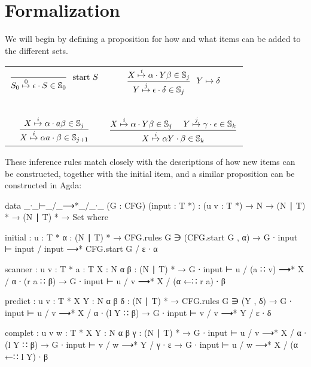 	\section{Formalization}

		We will begin by defining a proposition for how and what items can be
		added to the different sets.

		\begin{table}[h]
			\centering
			\begin{tabular}{cc}
				\( \displaystyle \frac{}
					{\earley{S_0}{\epsilon}{S}{0} \in \mathbb{S}_0}
					~~\textrm{start } S
					\) &
				\( \displaystyle \frac
					{\earley{X}{\alpha}{Y\beta}{i} \in \mathbb{S}_j}
					{\earley{Y}{\epsilon}{\delta}{j} \in \mathbb{S}_j}
					~~Y \mapsto \delta
					\)
				\\~&~\\
				\( \displaystyle \frac
					{\earley{X}{\alpha}{a\beta}{i} \in \mathbb{S}_j}
					{\earley{X}{\alpha a}{\beta}{i} \in \mathbb{S}_{j+1}}
					\) &
				\( \displaystyle \frac
					{
						\earley{X}{\alpha}{Y\beta}{i} \in \mathbb{S}_j~~~~
						\earley{Y}{\gamma}{\epsilon}{j} \in \mathbb{S}_k
						}
					{\earley{X}{\alpha Y}{\beta}{i} \in \mathbb{S}_k}
					\)
			\end{tabular}
		\end{table}

		These inference rules match closely with the descriptions of how new
		items can be constructed, together with the initial item, and a similar
		proposition can be constructed in Agda:

		\begin{code}
			data _∙_⊢_/_⟶*_/_∙_ (G : CFG) (input : T *) :
			  (u v : T *) → N → (N ∣ T) * → (N ∣ T) * → Set where

			  initial : {u : T *} {α : (N ∣ T) *} →
			    CFG.rules G ∋ (CFG.start G , α) →
			    G ∙ input ⊢ input / input ⟶* CFG.start G / ε ∙ α

			  scanner : {u v : T *} {a : T} {X : N} {α β : (N ∣ T) *} →
			    G ∙ input ⊢ u / (a ∷ v) ⟶* X / α ∙ (r a ∷ β) →
			    G ∙ input ⊢ u / v ⟶* X / (α ←∷ r a) ∙ β

			  predict : {u v : T *} {X Y : N} {α β δ : (N ∣ T) *} →
			    CFG.rules G ∋ (Y , δ) →
			    G ∙ input ⊢ u / v ⟶* X / α ∙ (l Y ∷ β) →
			    G ∙ input ⊢ v / v ⟶* Y / ε ∙ δ

			  complet : {u v w : T *} {X Y : N} {α β γ : (N ∣ T) *} →
			    G ∙ input ⊢ u / v ⟶* X / α ∙ (l Y ∷ β) →
			    G ∙ input ⊢ v / w ⟶* Y / γ ∙ ε →
			    G ∙ input ⊢ u / w ⟶* X / (α ←∷ l Y) ∙ β
		\end{code}

